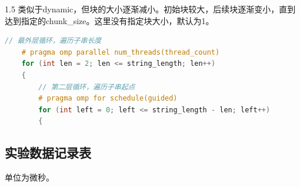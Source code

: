 \documentclass[zihao=-4]{ctexart}
\begin{document}
\begin{spacing}{1.5}
类似于dynamic，但块的大小逐渐减小。初始块较大，后续块逐渐变小，直到达到指定的chunk\_size。这里没有指定块大小，默认为1。

\begin{lstlisting}[language=C++,title={默认引导式调度}]
    // 最外层循环，遍历子串长度
    # pragma omp parallel num_threads(thread_count)
    for (int len = 2; len <= string_length; len++)
    {
        // 第二层循环，遍历子串起点
        # pragma omp for schedule(guided)
        for (int left = 0; left <= string_length - len; left++)
        {
\end{lstlisting}

\subsection{实验数据记录表}

单位为微秒。


\end{spacing}
\end{document}
